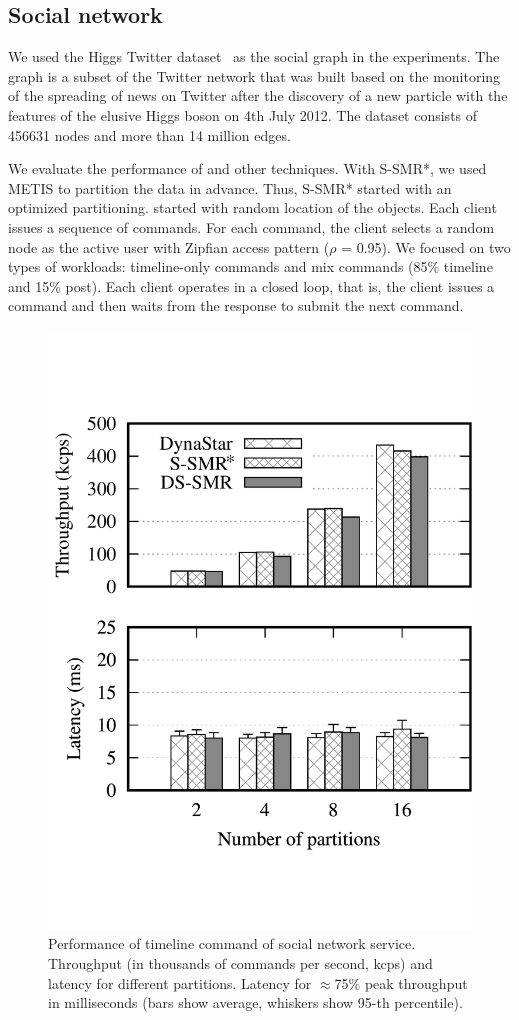 \subsection{Social network}

We used the Higgs Twitter dataset~\cite{snapnets} as the social graph in the
experiments. The graph is a subset of the Twitter network that was built based
on the monitoring of the spreading of news on Twitter after the discovery of a
new particle with the features of the elusive Higgs boson on 4th July 2012. The
dataset consists of 456631 nodes and more than 14 million edges.

We evaluate the performance of \dynastar and other techniques. With S-SMR*, we
used METIS to partition the data in advance. Thus, S-SMR* started with an
optimized partitioning. \dynastar started with random location of the objects.
Each client issues a sequence of commands. For each command, the client selects
a random node as the active user with Zipfian access pattern ($\rho$ = 0.95). We
focused on two types of workloads: timeline-only commands and mix commands (85\%
timeline and 15\% post). Each client operates in a closed loop, that is, the
client issues a command and then waits from the response to submit the next
command.

\begin{figure}[ht!]
  \centering
    \includegraphics[width=0.6\columnwidth]{figures/experiments/dynastar/chirper-compare-timeline-no-title}
  \caption{Performance of timeline command of social network service. Throughput
  (in thousands of commands per second, kcps) and latency for different
  partitions. Latency for $\approx$75\% peak throughput in milliseconds (bars
  show average, whiskers show 95-th percentile).}
  \label{fig:socialscalability-timeline}
\end{figure}



